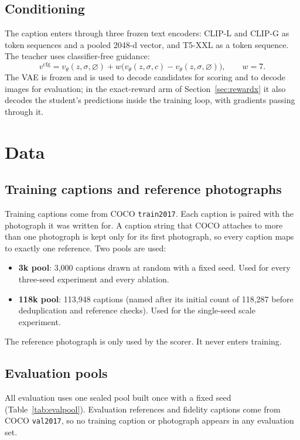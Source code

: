 \documentclass[11pt,a4paper]{article}
\begin{document}
\subsection{Conditioning}
The caption enters through three frozen text encoders: CLIP-L and CLIP-G as token sequences and a pooled 2048-d vector, and T5-XXL as a token sequence. The teacher uses classifier-free guidance:
\begin{equation}
v^{\mathrm{cfg}}=v_\theta(z,\sigma,\varnothing)+w\big(v_\theta(z,\sigma,c)-v_\theta(z,\sigma,\varnothing)\big),\qquad w=7.
\end{equation}
The VAE is frozen and is used to decode candidates for scoring and to decode images for evaluation; in the exact-reward arm of Section~\ref{sec:rewardx} it also decodes the student's predictions inside the training loop, with gradients passing through it.

\section{Data}

\subsection{Training captions and reference photographs}
Training captions come from COCO \texttt{train2017}. Each caption is paired with the photograph it was written for. A caption string that COCO attaches to more than one photograph is kept only for its first photograph, so every caption maps to exactly one reference. Two pools are used:
\begin{itemize}
\item \textbf{3k pool}: 3,000 captions drawn at random with a fixed seed. Used for every three-seed experiment and every ablation.
\item \textbf{118k pool}: 113,948 captions (named after its initial count of 118,287 before deduplication and reference checks). Used for the single-seed scale experiment.
\end{itemize}
The reference photograph is only used by the scorer. It never enters training.

\subsection{Evaluation pools}
All evaluation uses one sealed pool built once with a fixed seed (Table~\ref{tab:evalpool}). Evaluation references and fidelity captions come from COCO \texttt{val2017}, so no training caption or photograph appears in any evaluation set.
\end{document}
